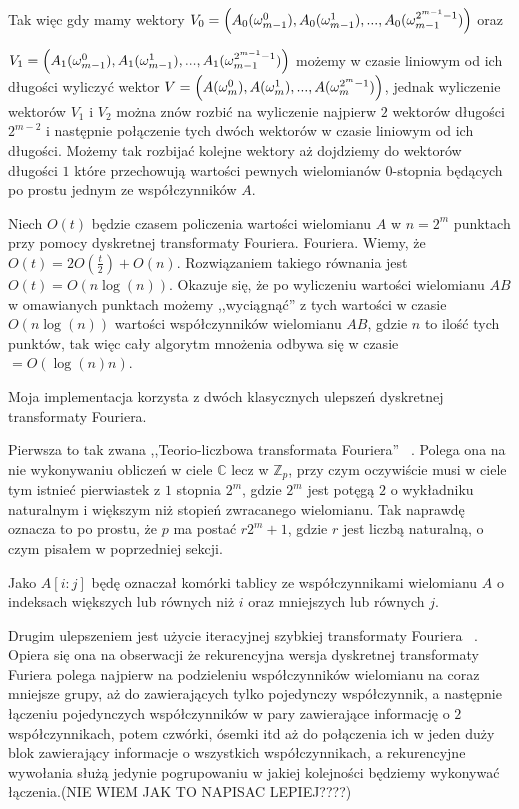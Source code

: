 \documentclass{article}
\begin{document}
Tak więc gdy mamy wektory $V_0=\Bigl( A_0(\omega_{m-1}^0),A_0(\omega_{m-1}^1),...,A_0(\omega_{m-1}^{2^{m-1}-1})\Bigr)$ oraz                          

$V_1=\Bigl( A_1(\omega_{m-1}^0),A_1(\omega_{m-1}^1),...,A_1(\omega_{m-1}^{2^{m-1}-1})\Bigr)$ możemy
w czasie liniowym od ich długości wyliczyć wektor $V=\Bigl( A(\omega_{m}^0),A(\omega_{m}^1),...,A(\omega_{m}^{2^{m}-1})\Bigr)$, jednak wyliczenie wektorów 
$V_1$ i $V_2$ można znów rozbić na wyliczenie najpierw $2$ wektorów długości $2^{m-2}$ i 
następnie połączenie tych dwóch wektorów w czasie liniowym od ich długości. Możemy tak rozbijać kolejne wektory aż dojdziemy do wektorów długości
$1$ które przechowują wartości pewnych wielomianów $0$-stopnia będących po prostu jednym ze współczynników $A$.

Niech $O(t)$ będzie czasem policzenia wartości wielomianu $A$ w $n=2^m$ punktach przy pomocy dyskretnej transformaty Fouriera. 
Fouriera. Wiemy, że $O(t)=2O(\frac{t}{2})+O(n)$. Rozwiązaniem takiego równania jest $O(t)=O(n\log(n))$.
Okazuje się, że po wyliczeniu wartości wielomianu $AB$ w omawianych punktach możemy ,,wyciągnąć'' z tych wartości w czasie
$O(n\log(n))$ wartości współczynników wielomianu $AB$, gdzie $n$ to ilość tych punktów, tak więc cały algorytm mnożenia odbywa się w czasie $=O(\log(n)n)$.

Moja implementacja korzysta z dwóch klasycznych ulepszeń dyskretnej transformaty Fouriera. 

Pierwsza to tak zwana ,,Teorio-liczbowa transformata Fouriera'' ~\cite{garg2017digital}. Polega ona na nie wykonywaniu obliczeń w ciele $\mathbb{C}$ lecz
w $\mathbb{Z}_p$, przy czym oczywiście musi w ciele tym istnieć pierwiastek z $1$ stopnia $2^m$, gdzie $2^m$ jest potęgą $2$ o wykładniku
naturalnym i większym niż stopień zwracanego wielomianu. 
Tak naprawdę oznacza to po prostu, że $p$ ma postać $r2^m+1$, gdzie $r$ jest liczbą naturalną, o czym pisałem w poprzedniej 
sekcji.

Jako $A[i:j]$ będę oznaczał komórki tablicy ze współczynnikami wielomianu $A$ o indeksach większych lub równych niż $i$ oraz mniejszych lub równych $j$. 


Drugim ulepszeniem jest użycie iteracyjnej szybkiej transformaty Fouriera ~\cite{wyrowski1988iterative}. Opiera się ona na obserwacji że rekurencyjna wersja dyskretnej transformaty Furiera 
polega najpierw na podzieleniu współczynników wielomianu na coraz mniejsze grupy, aż do zawierających tylko pojedynczy współczynnik, a następnie łączeniu pojedynczych współczynników
w pary zawierające informację o $2$ współczynnikach, potem czwórki, ósemki itd aż do połączenia ich w jeden duży blok zawierający informacje o wszystkich współczynnikach, a rekurencyjne wywołania służą jedynie 
pogrupowaniu w jakiej kolejności będziemy wykonywać łączenia.(NIE WIEM JAK TO NAPISAC LEPIEJ????)
\end{document}
